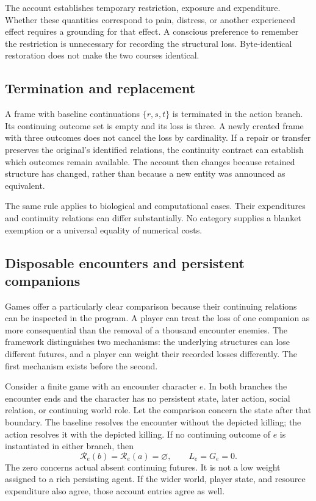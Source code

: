 \documentclass[11pt,a4paper]{article}
\theoremstyle{remark}
\newcommand{\R}{\mathcal R}
\begin{document}
The account establishes temporary restriction, exposure and expenditure. Whether
these quantities correspond to pain, distress, or another experienced effect
requires a grounding for that effect. A conscious preference to remember the
restriction is unnecessary for recording the structural loss. Byte-identical
restoration does not make the two courses identical.

\subsection{Termination and replacement}

A frame with baseline continuations $\{r,s,t\}$ is terminated in the action
branch. Its continuing outcome set is empty and its loss is three. A newly
created frame with three outcomes does not cancel the loss by cardinality.
If a repair or transfer preserves the original's identified relations, the
continuity contract can establish which outcomes remain available. The account
then changes because retained structure has changed, rather than because a
new entity was announced as equivalent.

The same rule applies to biological and computational cases. Their expenditures
and continuity relations can differ substantially. No category supplies a
blanket exemption or a universal equality of numerical costs.

\subsection{Disposable encounters and persistent companions}\label{sec:games}

Games offer a particularly clear comparison because their continuing relations
can be inspected in the program. A player can treat the loss of one companion
as more consequential than the removal of a thousand encounter enemies. The
framework distinguishes two mechanisms: the underlying structures can lose
different futures, and a player can weight their recorded losses differently.
The first mechanism exists before the second.

Consider a finite game with an encounter character $e$. In both branches the
encounter ends and the character has no persistent state, later action, social
relation, or continuing world role. Let the comparison concern the state after
that boundary. The baseline resolves the encounter without the depicted killing;
the action resolves it with the depicted killing. If no continuing outcome of
$e$ is instantiated in either branch, then
\begin{equation}\label{eq:npc}
\R_e(b)=\R_e(a)=\varnothing,\qquad L_e=G_e=0.
\end{equation}
The zero concerns actual absent continuing futures. It is not a low weight
assigned to a rich persisting agent. If the wider world, player state, and
resource expenditure also agree, those account entries agree as well.
\end{document}
